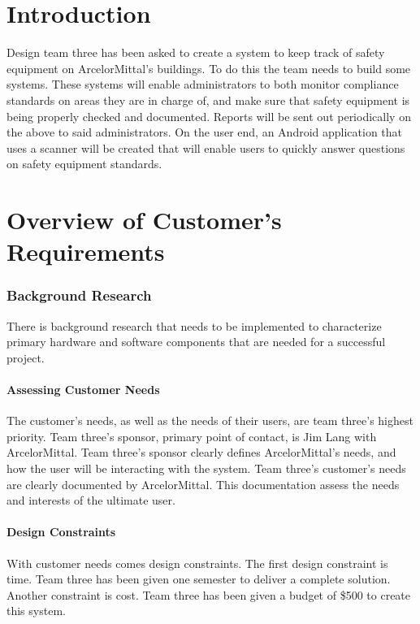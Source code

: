 \documentclass[Letter,11pt]{article}
\begin{document}
	
			\tableofcontents
			\listoffigures
			\begingroup
			\let\clearpage\relax
			\listoftables
			\endgroup
			\newpage	


\part{Introduction}
		Design team three has been asked to create a system to keep track of safety equipment on ArcelorMittal's buildings. To do this the team needs to build some systems. These systems will enable administrators to both monitor compliance standards on areas they are in charge of, and make sure that safety equipment is being properly checked and documented. Reports will be sent out periodically on the above to said administrators.  On the user end, an Android application  that uses a scanner will be created that will enable users to quickly answer questions on safety equipment standards.

\part{Overview of Customer's Requirements}
\section{Background Research}\label{research}
	There is background research that needs to be implemented to characterize primary hardware and software components that are needed for a successful project. \\
	\subsection{Assessing Customer Needs}\label{custneeds}

	The customer's needs, as well as the needs of their users, are team three's highest priority. Team three's sponsor, primary point of contact, is Jim Lang with ArcelorMittal. Team three's sponsor clearly defines ArcelorMittal's needs, and how the user will be interacting with the system. Team three's customer's needs are clearly documented by ArcelorMittal. This documentation assess the needs and interests of the ultimate user. \\ 


	\subsection{Design Constraints}
	With customer needs comes design constraints. The first design constraint is time. Team three has been given one semester to deliver a complete solution. Another constraint is cost. Team three has been given a budget of \$500 to create this system.\\
\end{document}
